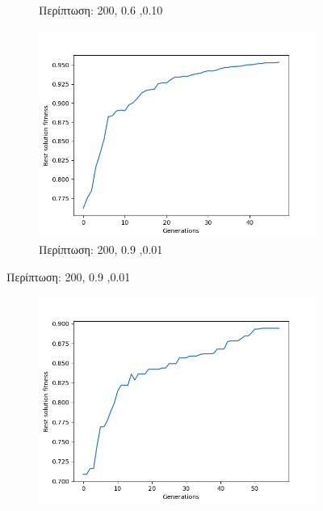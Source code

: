 \documentclass[12pt,a4paper]{article}
\begin{document}
\begin{enumerate}
\begin{figure}[H]
\begin{subfigure}[h]{0.7\textwidth}
                         \caption*{Περίπτωση: 200, 0.6 ,0.10}
                     \end{subfigure}
                     \begin{subfigure}[h]{0.7\textwidth}
                         \centering
                         \includegraphics[width=\textwidth]{images/9s.png}
                         \caption*{Περίπτωση: 200, 0.9 ,0.01}
                     \end{subfigure}
                 \end{figure}
                 \begin{figure}[H]
                     \centering
                     \begin{subfigure}[ht]{0.7\textwidth}
                         \centering
                         \includegraphics[width=\textwidth]{images/10s.png}

\end{subfigure}
\end{figure}
\end{enumerate}
\end{document}
